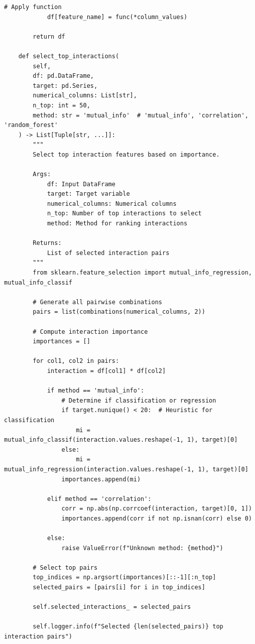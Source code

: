 \begin{lstlisting}[style=python, caption={Intelligent Feature Interaction Generation}]
            # Apply function
            df[feature_name] = func(*column_values)

        return df

    def select_top_interactions(
        self,
        df: pd.DataFrame,
        target: pd.Series,
        numerical_columns: List[str],
        n_top: int = 50,
        method: str = 'mutual_info'  # 'mutual_info', 'correlation', 'random_forest'
    ) -> List[Tuple[str, ...]]:
        """
        Select top interaction features based on importance.

        Args:
            df: Input DataFrame
            target: Target variable
            numerical_columns: Numerical columns
            n_top: Number of top interactions to select
            method: Method for ranking interactions

        Returns:
            List of selected interaction pairs
        """
        from sklearn.feature_selection import mutual_info_regression, mutual_info_classif

        # Generate all pairwise combinations
        pairs = list(combinations(numerical_columns, 2))

        # Compute interaction importance
        importances = []

        for col1, col2 in pairs:
            interaction = df[col1] * df[col2]

            if method == 'mutual_info':
                # Determine if classification or regression
                if target.nunique() < 20:  # Heuristic for classification
                    mi = mutual_info_classif(interaction.values.reshape(-1, 1), target)[0]
                else:
                    mi = mutual_info_regression(interaction.values.reshape(-1, 1), target)[0]
                importances.append(mi)

            elif method == 'correlation':
                corr = np.abs(np.corrcoef(interaction, target)[0, 1])
                importances.append(corr if not np.isnan(corr) else 0)

            else:
                raise ValueError(f"Unknown method: {method}")

        # Select top pairs
        top_indices = np.argsort(importances)[::-1][:n_top]
        selected_pairs = [pairs[i] for i in top_indices]

        self.selected_interactions_ = selected_pairs

        self.logger.info(f"Selected {len(selected_pairs)} top interaction pairs")


\end{lstlisting}
